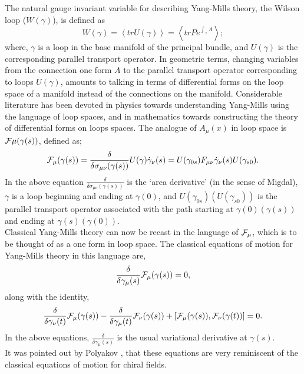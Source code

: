 \documentclass[a4paper,12]{article}
\begin{document}
 The natural gauge invariant variable for describing 
Yang-Mills theory, the Wilson loop ($W(\gamma )$), is defined as 
\begin{equation}
W(\gamma 
) 
= \left<tr U(\gamma )\right> = \left<tr P e^{\int_{\gamma }A} 
\right>\nonumber;
\end{equation} 
where, $\gamma $ is a loop in the base manifold of the principal 
bundle, and 
$U(\gamma )$  is the corresponding parallel transport operator. In 
geometric terms, changing variables from the connection one form $A$ to 
the parallel transport operator corresponding to loops $U(\gamma )$, 
amounts to talking in terms of differential forms on the loop space of a 
manifold instead of the connections on the manifold. Considerable 
literature has been devoted in physics\cite{Migdal1, Polyakov:glue, MME1, 
MME2, Loopspace, gambini1, gambini2, Yaffe1} towards understanding 
Yang-Mills 
using the language of loop spaces, and in mathematics\cite{chen1, chen2, 
chen3} towards constructing 
the theory of differential forms on loops spaces. The analogue of $A_\mu 
(x)$ in loop space is ${\cal{F}}\mu (\gamma (s))$, defined as;
\begin{equation}
{\cal{F }}_\mu (\gamma (s)) = \frac{\delta }{\delta \sigma _{\mu \nu 
}(\gamma (s))}U(\gamma )\dot{\gamma }_\nu (s) = U(\gamma _{0s})F_{\mu \nu 
}\dot{\gamma }_\nu (s)U(\gamma _{s0}).
\end{equation}
In the above equation $\frac{\delta }{\delta \sigma _{\mu \nu }(\gamma 
(s))}$ is the `area derivative' (in the sense of Migdal\cite{Migdal1, 
MME1, MME2}), $\gamma $ is a 
loop beginning and ending at $\gamma (0)$, and $U(\gamma _{0s}) (U(\gamma 
_{s0}))$ is the 
parallel transport operator associated with the path starting at $\gamma 
(0) (\gamma (s))$ and ending at $\gamma (s) (\gamma (0))$.\\
Classical Yang-Mills theory can now be recast in the language of ${\cal 
{F}}_\mu $, which is to be thought of as a one form in loop space. The 
classical equations of motion for Yang-Mills theory in this language are,
\begin{equation}
\frac{\delta }{\delta \gamma _\mu (s)}{\cal{F}}_\mu (\gamma (s)) = 0,
\end{equation} 
along with the identity,
\begin{equation}
\frac{\delta }{\delta \gamma _\nu (t)}{\cal{F}}_\mu (\gamma (s)) - 
\frac{\delta }{\delta \gamma _\mu (t)}{\cal{F}}_\nu (\gamma (s)) + 
\left[{\cal{F}}_\mu (\gamma (s)),{\cal{F}}_\nu (\gamma (t))\right] = 0.
\end{equation}
In the above equations, $\frac{\delta }{\delta \gamma _\mu (s)}$ is the 
usual variational derivative at $\gamma (s)$.\\
It was pointed out by Polyakov \cite{Polyakov:glue}, that these equations 
are 
very 
reminiscent of 
the 
classical equations of motion 
for chiral fields.\\
\end{document}

